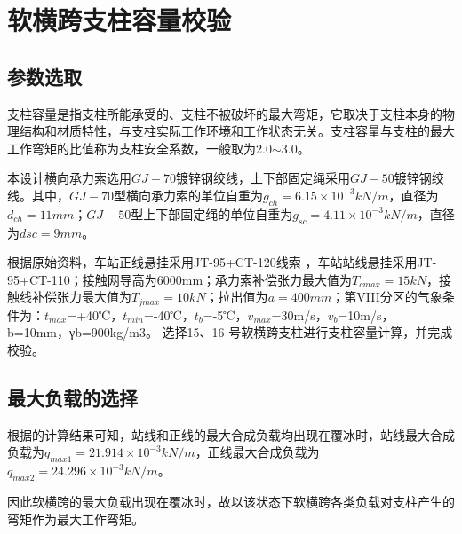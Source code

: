 \chapter{软横跨支柱容量校验}
\section{参数选取}
支柱容量是指支柱所能承受的、支柱不被破坏的最大弯矩，它取决于支柱本身的物理结构和材质特性，与支柱实际工作环境和工作状态无关。支柱容量与支柱的最大工作弯矩的比值称为支柱安全系数，一般取为2.0$\sim$3.0。

本设计横向承力索选用$GJ-70$镀锌钢绞线，上下部固定绳采用$GJ-50$镀锌钢绞线。其中，$GJ-70$型横向承力索的单位自重为$g_{ch}=6.15×10^{-3} kN/m$，直径为$d_{ch}=11mm$；$GJ-50$型上下部固定绳的单位自重为$g_{sc}=4.11×10^{-3}kN/m$，直径为$dsc=9mm$。

根据原始资料，车站正线悬挂采用JT-95+CT-120线索 ，车站站线悬挂采用JT-95+CT-110；接触网导高为6000mm；承力索补偿张力最大值为$T_{cmax}=15kN$，接触线补偿张力最大值为$T_{jmax}=10kN$；拉出值为$a=400mm$；第VIII分区的气象条件为：$t_{max}$=+40℃，$t_{min}$=-40℃，$t_b$=-5℃，$v_{max}$=30m/s，$v_b$=10m/s，b=10mm，γb=900kg/m3。
选择15、16 号软横跨支柱进行支柱容量计算，并完成校验。

\section{最大负载的选择}
根据的计算结果可知，站线和正线的最大合成负载均出现在覆冰时，站线最大合成负载为$q_{max1}=21.914×10^{-3} kN/m$，正线最大合成负载为$q_{max2}=24.296×10^{-3} kN/m$。

因此软横跨的最大负载出现在覆冰时，故以该状态下软横跨各类负载对支柱产生的弯矩作为最大工作弯矩。

